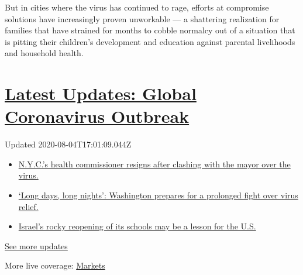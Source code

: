 But in cities where the virus has continued to rage, efforts at
compromise solutions have increasingly proven unworkable --- a
shattering realization for families that have strained for months to
cobble normalcy out of a situation that is pitting their children's
development and education against parental livelihoods and household
health.

\hypertarget{latest-updates-global-coronavirus-outbreak}{%
\section{\texorpdfstring{\href{https://www.nytimes.com/2020/08/04/world/coronavirus-covid-19.html?action=click\&pgtype=Article\&state=default\&region=MAIN_CONTENT_1\&context=storylines_live_updates}{Latest
Updates: Global Coronavirus
Outbreak}}{Latest Updates: Global Coronavirus Outbreak}}\label{latest-updates-global-coronavirus-outbreak}}

Updated 2020-08-04T17:01:09.044Z

\begin{itemize}
\tightlist
\item
  \href{https://www.nytimes.com/2020/08/04/world/coronavirus-covid-19.html?action=click\&pgtype=Article\&state=default\&region=MAIN_CONTENT_1\&context=storylines_live_updates\#link-4d1eafa8}{N.Y.C.'s
  health commissioner resigns after clashing with the mayor over the
  virus.}
\item
  \href{https://www.nytimes.com/2020/08/04/world/coronavirus-covid-19.html?action=click\&pgtype=Article\&state=default\&region=MAIN_CONTENT_1\&context=storylines_live_updates\#link-6b644638}{`Long
  days, long nights': Washington prepares for a prolonged fight over
  virus relief.}
\item
  \href{https://www.nytimes.com/2020/08/04/world/coronavirus-covid-19.html?action=click\&pgtype=Article\&state=default\&region=MAIN_CONTENT_1\&context=storylines_live_updates\#link-7af9fca0}{Israel's
  rocky reopening of its schools may be a lesson for the U.S.}
\end{itemize}

\href{https://www.nytimes.com/2020/08/04/world/coronavirus-covid-19.html?action=click\&pgtype=Article\&state=default\&region=MAIN_CONTENT_1\&context=storylines_live_updates}{See
more updates}

More live coverage:
\href{https://www.nytimes.com/live/2020/08/04/business/stock-market-today-coronavirus?action=click\&pgtype=Article\&state=default\&region=MAIN_CONTENT_1\&context=storylines_live_updates}{Markets}

